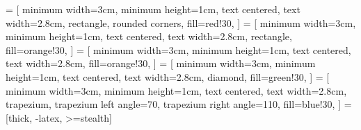 %
%

\RequirePackage{xcolor}


%
\def\ddfc@minimumwidth{3cm}
\def\ddfc@textwidth{2.8cm}

%
%
\RequirePackage{tikz}
\usetikzlibrary{shapes.geometric, arrows}

 = [
	minimum width=\ddfc@minimumwidth,
	minimum height=1cm,
	text centered,
	text width=\ddfc@textwidth,
	rectangle,
	rounded corners,
	fill=red!30,
]
 = [
	minimum width=\ddfc@minimumwidth,
	minimum height=1cm,
	text centered,
	text width=\ddfc@textwidth,
	rectangle,
	fill=orange!30,
]
 = [
	minimum width=\ddfc@minimumwidth,
	minimum height=1cm,
	text centered,
	text width=\ddfc@textwidth,
	fill=orange!30,
]
 = [
	minimum width=\ddfc@minimumwidth,
	minimum height=1cm,
	text centered,
	text width=\ddfc@textwidth,
	diamond,
	fill=green!30,
]
 = [
	minimum width=\ddfc@minimumwidth,
	minimum height=1cm,
	text centered,
	text width=\ddfc@textwidth,
	trapezium,
	trapezium left angle=70,
	trapezium right angle=110,
	fill=blue!30,
]
 = [thick, -latex, >=stealth]


%
%

